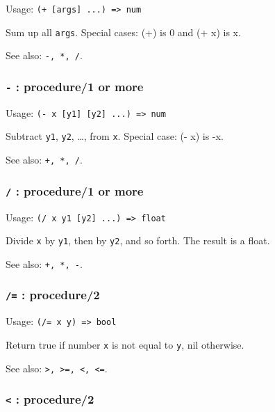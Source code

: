 \documentclass[
]{article}
\newcommand{\passthrough}[1]{#1}
\begin{document}
Usage: \passthrough{\lstinline!(+ [args] ...) => num!}

Sum up all \passthrough{\lstinline!args!}. Special cases: (+) is 0 and
(+ x) is x.

See also: \passthrough{\lstinline!-, *, /!}.

\hypertarget{procedure1-or-more}{%
\subsubsection{\texorpdfstring{\texttt{-} : procedure/1 or
more}{- : procedure/1 or more}}\label{procedure1-or-more}}

Usage: \passthrough{\lstinline!(- x [y1] [y2] ...) => num!}

Subtract \passthrough{\lstinline!y1!}, \passthrough{\lstinline!y2!},
\ldots, from \passthrough{\lstinline!x!}. Special case: (- x) is -x.

See also: \passthrough{\lstinline!+, *, /!}.

\hypertarget{procedure1-or-more-1}{%
\subsubsection{\texorpdfstring{\texttt{/} : procedure/1 or
more}{/ : procedure/1 or more}}\label{procedure1-or-more-1}}

Usage: \passthrough{\lstinline!(/ x y1 [y2] ...) => float!}

Divide \passthrough{\lstinline!x!} by \passthrough{\lstinline!y1!}, then
by \passthrough{\lstinline!y2!}, and so forth. The result is a float.

See also: \passthrough{\lstinline!+, *, -!}.

\hypertarget{procedure2-1}{%
\subsubsection{\texorpdfstring{\texttt{/=} :
procedure/2}{/= : procedure/2}}\label{procedure2-1}}

Usage: \passthrough{\lstinline!(/= x y) => bool!}

Return true if number \passthrough{\lstinline!x!} is not equal to
\passthrough{\lstinline!y!}, nil otherwise.

See also: \passthrough{\lstinline!>, >=, <, <=!}.

\hypertarget{procedure2-2}{%
\subsubsection{\texorpdfstring{\texttt{\textless{}} :
procedure/2}{\textless{} : procedure/2}}\label{procedure2-2}}
\end{document}
